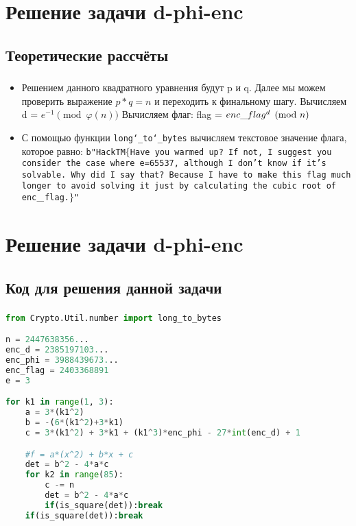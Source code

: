 \documentclass[t]{beamer}
\begin{document}
\section{Решение задачи d-phi-enc}
\subsection{Теоретические рассчёты}
\begin{frame}[t] %
	\frametitle{\insertsection}
	\framesubtitle{\insertsubsection}
        \begin{itemize}
            \item Решением данного квадратного уравнения будут p и q. Далее мы можем проверить выражение $p*q=n$ и переходить к финальному шагу.\newline
            Вычисляем d = $e^{-1}\pmod{\varphi(n)}$\newline
            Вычисляем флаг: flag = \texttt{$enc\char`_flag^d \pmod{n}$}\newline
            \item С помощью функции \texttt{long\char`_to\char`_bytes} вычисляем текстовое значение флага, которое равно:\newline
            \texttt{b"HackTM$\{$Have you warmed up? If not, I suggest you consider the case where e=65537, although I don't know if it's solvable. Why did I say that? Because I have to make this flag much longer to avoid solving it just by calculating the cubic root of enc$\char`_$flag.$\}$"}
	\end{itemize}
\end{frame}

\section{Решение задачи d-phi-enc}
\subsection{Код для решения данной задачи}
\begin{frame}[fragile]
	\frametitle{\insertsection} 
	\framesubtitle{\insertsubsection}
	\footnotesize
	\smaller
\begin{lstlisting}[language=Python]
from Crypto.Util.number import long_to_bytes

n = 2447638356...
enc_d = 2385197103...
enc_phi = 3988439673...
enc_flag = 2403368891
e = 3

for k1 in range(1, 3):
    a = 3*(k1^2)
    b = -(6*(k1^2)+3*k1)
    c = 3*(k1^2) + 3*k1 + (k1^3)*enc_phi - 27*int(enc_d) + 1

    #f = a*(x^2) + b*x + c
    det = b^2 - 4*a*c
    for k2 in range(85):
        c -= n
        det = b^2 - 4*a*c
        if(is_square(det)):break
    if(is_square(det)):break
\end{lstlisting}	
\end{frame}
\end{document}
